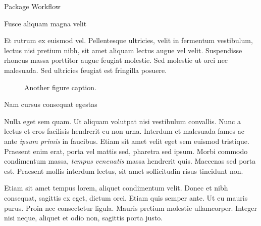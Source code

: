 \documentclass[final]{beamer}
\newlength{\colwidth}
\begin{document}
\begin{frame}[t]
\begin{columns}[t]
\begin{column}{\colwidth}
\begin{block}{Package Workflow}
  \end{block}

  \begin{block}{Fusce aliquam magna velit}

    Et rutrum ex euismod vel. Pellentesque ultricies, velit in fermentum
    vestibulum, lectus nisi pretium nibh, sit amet aliquam lectus augue vel
    velit. Suspendisse rhoncus massa porttitor augue feugiat molestie. Sed
    molestie ut orci nec malesuada. Sed ultricies feugiat est fringilla
    posuere.

    \begin{figure}
      \centering
      \caption{Another figure caption.}
    \end{figure}

  \end{block}

  \begin{block}{Nam cursus consequat egestas}

    Nulla eget sem quam. Ut aliquam volutpat nisi vestibulum convallis. Nunc a
    lectus et eros facilisis hendrerit eu non urna. Interdum et malesuada fames
    ac ante \textit{ipsum primis} in faucibus. Etiam sit amet velit eget sem
    euismod tristique. Praesent enim erat, porta vel mattis sed, pharetra sed
    ipsum. Morbi commodo condimentum massa, \textit{tempus venenatis} massa
    hendrerit quis. Maecenas sed porta est. Praesent mollis interdum lectus,
    sit amet sollicitudin risus tincidunt non.

    Etiam sit amet tempus lorem, aliquet condimentum velit. Donec et nibh
    consequat, sagittis ex eget, dictum orci. Etiam quis semper ante. Ut eu
    mauris purus. Proin nec consectetur ligula. Mauris pretium molestie
    ullamcorper. Integer nisi neque, aliquet et odio non, sagittis porta justo.


\end{block}
\end{column}
\end{columns}
\end{frame}
\end{document}
